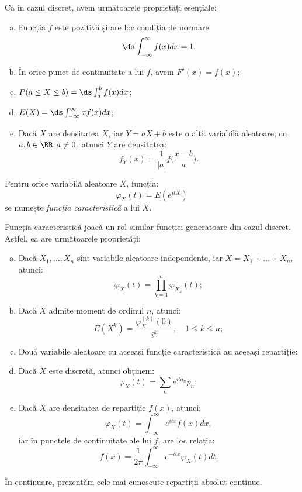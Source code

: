 Ca în cazul discret, avem următoarele proprietăți esențiale:
\begin{enumerate}[(a)]
\item Funcția $ f $ este pozitivă și are loc condiția de normare
  \[
    \ds\int_{-\infty}^\infty f(x) dx = 1.
  \]
\item În orice punct de continuitate a lui $ f $, avem $ F'(x) = f(x) $;
\item $ P(a \leq X \leq b) = \ds\int_a^b f(x) dx $;
\item $ E(X) = \ds\int_{-\infty}^\infty xf(x) dx $;
\item Dacă $ X $ are densitatea $ X $, iar $ Y = aX + b $ este o altă variabilă
  aleatoare, cu $ a, b \in \RR, a \neq 0 $, atunci $ Y $ are densitatea:
  \[
    f_Y(x) = \frac{1}{|a|} f \Big( \frac{x - b}{a} \Big).
  \]
\end{enumerate}

\begin{definition}\label{def:fc-car}
  Pentru orice variabilă aleatoare $ X $, funcția:
  \[
    \varphi_X(t) = E(e^{itX})
  \]
  se numește \emph{funcția caracteristică} a lui $ X $.
\end{definition}

Funcția caracteristică joacă un rol similar funcției generatoare din cazul discret.
Astfel, ea are următoarele proprietăți:
\begin{enumerate}[(a)]
\item Dacă $ X_1, \dots, X_n $ sînt variabile aleatoare independente, iar
  $ X = X_1 + \dots + X_n  $, atunci:
  \[
    \varphi_X(t) = \prod_{k = 1}^n \varphi_{X_k}(t);
  \]
\item Dacă $ X $ admite moment de ordinul $ n $, atunci:
  \[
    E(X^k) = \frac{\varphi_X^{(k)}(0)}{i^k}, \quad 1 \leq k \leq n;
  \]
\item Două variabile aleatoare cu aceeași funcție caracteristică au aceeași repartiție;
\item Dacă $ X $ este discretă, atunci obținem:
  \[
    \varphi_X(t) = \sum_n e^{ita_n} p_n;
  \]
\item Dacă $ X $ are densitatea de repartiție $ f(x) $, atunci:
  \[
    \varphi_X(t) = \int_{-\infty}^\infty e^{itx} f(x) dx,
  \]
  iar în punctele de continuitate ale lui $ f $, are loc relația:
  \[
    f(x) = \frac{1}{2\pi} \int_{-\infty}^\infty e^{-itx} \varphi_X(t) dt.
  \]
\end{enumerate}

În continuare, prezentăm cele mai cunoscute repartiții absolut continue.

